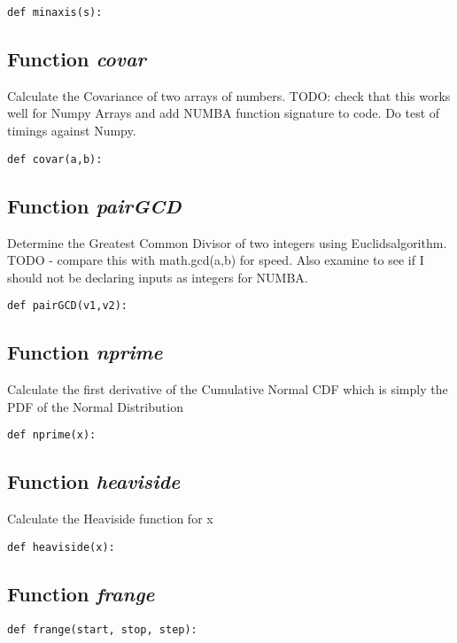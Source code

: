 \documentclass[twoside,11pt]{book}
\begin{document}
\begin{lstlisting}
def minaxis(s):
\end{lstlisting}

\subsection{Function {\it covar}}
Calculate the Covariance of two arrays of numbers. TODO: check that this works well for Numpy Arrays and add NUMBA function signature to code. Do test of timings against Numpy. 

\begin{lstlisting}
def covar(a,b):
\end{lstlisting}

\subsection{Function {\it pairGCD}}
Determine the Greatest Common Divisor of two integers using Euclidsalgorithm. TODO - compare this with math.gcd(a,b) for speed. Also examine to see if I should not be declaring inputs as integers for NUMBA. 

\begin{lstlisting}
def pairGCD(v1,v2):
\end{lstlisting}

\subsection{Function {\it nprime}}
Calculate the first derivative of the Cumulative Normal CDF which is simply the PDF of the Normal Distribution 

\begin{lstlisting}
def nprime(x):
\end{lstlisting}

\subsection{Function {\it heaviside}}
Calculate the Heaviside function for x 

\begin{lstlisting}
def heaviside(x):
\end{lstlisting}

\subsection{Function {\it frange}}


\begin{lstlisting}
def frange(start, stop, step):
\end{lstlisting}
\end{document}
